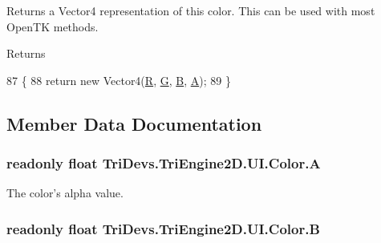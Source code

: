 Returns a Vector4 representation of this color. This can be used with most Open\-T\-K methods. 

\begin{DoxyReturn}{Returns}

\end{DoxyReturn}

\begin{DoxyCode}
87         \{
88             \textcolor{keywordflow}{return} \textcolor{keyword}{new} Vector4(\hyperlink{struct_tri_devs_1_1_tri_engine2_d_1_1_u_i_1_1_color_aa7c3ba09deebad2300f0d29b8e8c281d}{R}, \hyperlink{struct_tri_devs_1_1_tri_engine2_d_1_1_u_i_1_1_color_a62e164ea8c88b08b85de9bd80e9e33f1}{G}, \hyperlink{struct_tri_devs_1_1_tri_engine2_d_1_1_u_i_1_1_color_a0e823c9bd069dcc490d7eac642236eec}{B}, \hyperlink{struct_tri_devs_1_1_tri_engine2_d_1_1_u_i_1_1_color_a60e21c806260d757c76bde99a54fa937}{A});
89         \}
\end{DoxyCode}


\subsection{Member Data Documentation}
\hypertarget{struct_tri_devs_1_1_tri_engine2_d_1_1_u_i_1_1_color_a60e21c806260d757c76bde99a54fa937}{
\subsubsection[{A}]{\setlength{\rightskip}{0pt plus 5cm}readonly float Tri\-Devs.\-Tri\-Engine2\-D.\-U\-I.\-Color.\-A}}\label{struct_tri_devs_1_1_tri_engine2_d_1_1_u_i_1_1_color_a60e21c806260d757c76bde99a54fa937}


The color's alpha value. 

\hypertarget{struct_tri_devs_1_1_tri_engine2_d_1_1_u_i_1_1_color_a0e823c9bd069dcc490d7eac642236eec}{
\subsubsection[{B}]{\setlength{\rightskip}{0pt plus 5cm}readonly float Tri\-Devs.\-Tri\-Engine2\-D.\-U\-I.\-Color.\-B}}\label{struct_tri_devs_1_1_tri_engine2_d_1_1_u_i_1_1_color_a0e823c9bd069dcc490d7eac642236eec}



